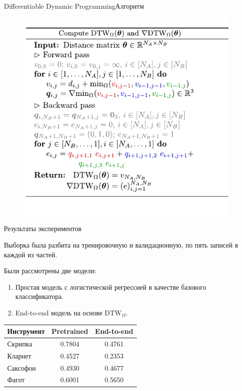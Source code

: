 \documentclass[unicode, dvipsnames]{beamer}
\begin{document}
\begin{frame}{Differentiable Dynamic Programming}{Алгоритм}
	\begin{figure}		
		\centering
		\vspace{-0.2em}
		\includegraphics[height=0.85\textheight]{./graphics/alg.pdf}
	\end{figure}
\end{frame}


\begin{frame}{Результаты экспериментов}

Выборка была разбита на тренировочную и валидационную, по пять записей в каждой из частей.

\bigskip
Были рассмотрены две модели: 
\begin{enumerate}
	\item Простая модель с логистической регрессией в качестве базового классификатора.
	\item End-to-end модель на основе $\mathrm{DTW}_\Omega$.
\end{enumerate}

\bigskip
\centering
\begin{tabular}{|l|c|c|}
	\hline
	Инструмент & Pretrained & End-to-end \\
	\hline
	Скрипка & 0.7804 & 0.4761 \\
	\hline
	Кларнет & 0.4527 & 0.2353 \\
	\hline
	Саксофон & 0.4930 & 0.4677 \\
	\hline
	Фагот & 0.6001 & 0.5650 \\
	\hline
\end{tabular}

\end{frame}
\end{document}
